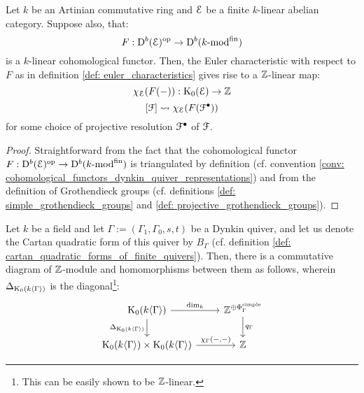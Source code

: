             \begin{lemma} \label{lemma: euler_characteristics_and_grothendieck_groups}
                Let $k$ be an Artinian commutative ring and $\mathcal{E}$ be a finite $k$-linear abelian category. Suppose also, that:
                    $$F: \mathrm{D}^b(\mathcal{E})^{\mathrm{op}} \to \mathrm{D}^b(k\text{-}\mathrm{mod}^{\mathrm{fin}})$$
                is a $k$-linear cohomological functor. Then, the Euler characteristic with respect to $F$ as in definition \ref{def: euler_characteristics} gives rise to a $\mathbb{Z}$-linear map:
                    $$\chi_{\mathcal{E}}(F(-)): \mathrm{K}_0(\mathcal{E}) \to \mathbb{Z}$$
                    $$[\mathcal{F}] \leadsto \chi_{\mathcal{E}}(F(\mathcal{F}^{\bullet}))$$
                for some choice of projective resolution $\mathcal{F}^{\bullet}$ of $\mathcal{F}$.
            \end{lemma}
                \begin{proof}
                    Straightforward from the fact that the cohomological functor $F: \mathrm{D}^b(\mathcal{E})^{\mathrm{op}} \to \mathrm{D}^b(k\text{-}\mathrm{mod}^{\mathrm{fin}})$ is triangulated by definition (cf. convention \ref{conv: cohomological_functors_dynkin_quiver_representations}) and from the definition of Grothendieck groups (cf. definitions \ref{def: simple_grothendieck_groups} and \ref{def: projective_grothendieck_groups}).
                \end{proof}
            \begin{theorem} \label{theorem: tits_quadratic_forms_as_euler_characteristics}
                Let $k$ be a field and let $\Gamma := (\Gamma_1, \Gamma_0, s, t)$ be a Dynkin quiver, and let us denote the Cartan quadratic form of this quiver by $B_{\Gamma}$ (cf. definition \ref{def: cartan_quadratic_forms_of_finite_quivers}). Then, there is a commutative diagram of $\mathbb{Z}$-module and homomorphisms between them as follows, wherein $\Delta_{\mathrm{K}_0(k\langle\Gamma\rangle)}$ is the diagonal\footnote{This can be easily shown to be $\mathbb{Z}$-linear.}:
                    $$
                        \begin{tikzcd}
                    	{\K_0(k\<\Gamma\>)} & {\Z^{\oplus \Phi_{\Gamma}^{\simple}}} \\
                    	{\K_0(k\<\Gamma\>) \x \K_0(k\<\Gamma\>)} & \Z
                    	\arrow["{\chi_{\Gamma}(-, -)}", from=2-1, to=2-2]
                    	\arrow["{\Delta_{\K_0(k\<\Gamma\>)}}"', from=1-1, to=2-1]
                    	\arrow["{\dim_k}", from=1-1, to=1-2]
                    	\arrow["{q_{\Gamma}}", from=1-2, to=2-2]
                        \end{tikzcd}
                    $$
            \end{theorem}
